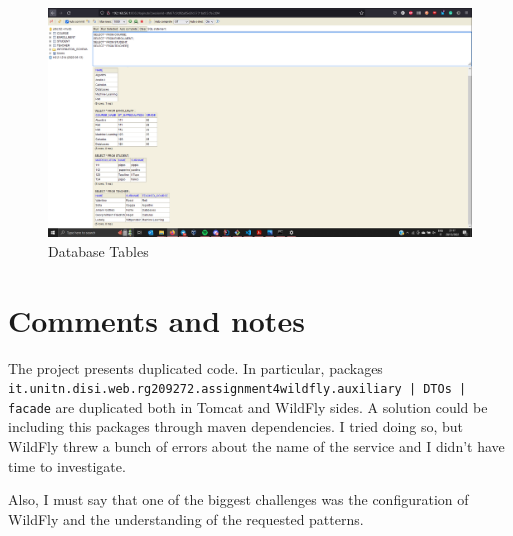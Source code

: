 \documentclass{article}
\begin{document}
\begin{figure}[h!]
    \centering
    \includegraphics[keepaspectratio,width=1\textwidth]{drawable/db.PNG}
    \caption{Database Tables}
\end{figure}

\newpage

\section*{Comments and notes}

The project presents duplicated code. In particular, packages \\\texttt{it.unitn.disi.web.rg209272.assignment4\textunderscore wildfly.auxiliary | DTOs | facade} are duplicated both in Tomcat and WildFly sides. A solution could be including this packages through maven dependencies. I tried doing so, but WildFly threw a bunch of errors about the name of the service and I didn't have time to investigate.

Also, I must say that one of the biggest challenges was the configuration of WildFly and the understanding of the requested patterns.
\end{document}
